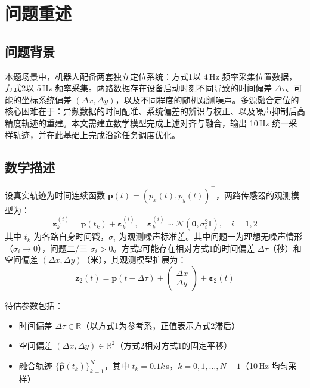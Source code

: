 \section{问题重述}\label{sec:problem}

\subsection{问题背景}
本题场景中，机器人配备两套独立定位系统：方式1以 4\,Hz 频率采集位置数据，方式2以 5\,Hz 频率采集。两路数据存在设备启动时刻不同导致的时间偏差 $\Delta\tau$、可能的坐标系统偏差 $(\Delta x, \Delta y)$，以及不同程度的随机观测噪声。多源融合定位的核心困难在于：异频数据的时间配准、系统偏差的辨识与校正、以及噪声抑制后高精度轨迹的重建。本文需建立数学模型完成上述对齐与融合，输出 10\,Hz 统一采样轨迹，并在此基础上完成沿途任务调度优化。

\subsection{数学描述}
设真实轨迹为时间连续函数 $\boldsymbol{p}(t) = (p_x(t), p_y(t))^\top$，两路传感器的观测模型为：
\begin{equation}
\boldsymbol{z}_k^{(i)} = \boldsymbol{p}(t_k) + \boldsymbol{\varepsilon}_k^{(i)}, \quad \boldsymbol{\varepsilon}_k^{(i)} \sim \mathcal{N}(\boldsymbol{0}, \sigma_i^2 \boldsymbol{I}), \quad i=1,2
\end{equation}
其中 $t_k$ 为各路自身时间戳，$\sigma_i$ 为观测噪声标准差。其中问题一为理想无噪声情形（$\sigma_i \to 0$），问题二/三 $\sigma_i > 0$。方式2可能存在相对方式1的时间偏差 $\Delta\tau$（秒）和空间偏差 $(\Delta x, \Delta y)$（米），其观测模型扩展为：
\begin{equation}
\boldsymbol{z}_2(t) = \boldsymbol{p}(t - \Delta\tau) + \begin{pmatrix} \Delta x \\ \Delta y \end{pmatrix} + \boldsymbol{\varepsilon}_2(t)
\end{equation}

待估参数包括：
\begin{itemize}
    \item 时间偏差 $\Delta\tau \in \mathbb{R}$（以方式1为参考系，正值表示方式2滞后）
    \item 空间偏差 $(\Delta x, \Delta y) \in \mathbb{R}^2$（方式2相对方式1的固定平移）
    \item 融合轨迹 $\{\hat{\boldsymbol{p}}(t_k)\}_{k=1}^N$，其中 $t_k = 0.1k$\,s，$k=0,1,\ldots,N-1$（10\,Hz 均匀采样）
\end{itemize}

